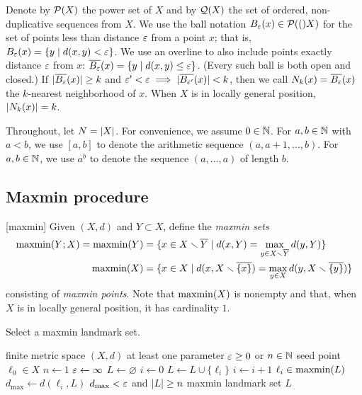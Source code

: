 \documentclass[
]{article}
\begin{document}
Denote by \(\mathcal{P}(X)\) the power set of \(X\) and by \(\mathcal{Q}(X)\) the
set of ordered, non-duplicative sequences from \(X\). We use the ball
notation \(B_{\varepsilon}(x) \in \mathcal{P}(()X)\) for the set of points less than
distance \(\varepsilon\) from a point \(x\); that is,
\(B_{\varepsilon}(x) = \{ y \mid d(x,y) < \varepsilon \}\). We use an overline to also
include points exactly distance \(\varepsilon\) from \(x\):
\(\overline{B_{\varepsilon}}(x) = \{ y \mid d(x,y) \leq \varepsilon \}\). (Every such ball
is both open and closed.) If \(\lvert \overline{B_\varepsilon}(x)\rvert \geq k\) and
\(\varepsilon'<\varepsilon \implies \lvert \overline{B_{\varepsilon'}}(x)\rvert < k\), then we call
\(N_k(x) = \overline{B_\varepsilon}(x)\) the \(k\)-nearest neighborhood of \(x\).
When \(X\) is in locally general position, \(\lvert N_k(x)\rvert = k\).

Throughout, let \(N=\lvert X\rvert\). For convenience, we assume \(0\in\mathbb{N}\).
For \(a,b \in \mathbb{N}\) with \(a<b\), we use \([a,b]\) to denote the
arithmetic sequence \((a,a+1,\ldots,b)\). For \(a,b \in \mathbb{N}\), we use
\(a^b\) to denote the sequence \((a,\ldots,a)\) of length \(b\).

\hypertarget{maxmin-procedure}{%
\subsection{Maxmin procedure}\label{maxmin-procedure}}

\label{sec:maxmin}

\begin{definition}\label{def:maxmin}[maxmin]
Given $(X,d)$ and $Y\subset X$, define the \emph{maxmin sets}
\begin{align*}
    \operatorname{maxmin}(Y;X) = \operatorname{maxmin}(Y) &= \{x\in X \smallsetminus \overline{Y}\mid d(x,Y) = \max_{y\in X\smallsetminus \overline{Y}}{d(y,Y)}\} \\
    \operatorname{maxmin}(X) &= \{x\in X\mid d(x,X \smallsetminus \overline{\{x\}}) = \max_{y\in X}{d(y,X \smallsetminus \overline{\{y\}})}\}
\end{align*}
consisting of \emph{maxmin points}.
Note that $\operatorname{maxmin}(X)$ is nonempty and that, when $X$ is in locally general position, it has cardinality $1$.
\end{definition}

\begin{algorithm}
\caption{Select a maxmin landmark set.}
\label{alg:maxmin}
\begin{algorithmic}[1]
\REQUIRE finite metric space $(X,d)$
\REQUIRE at least one parameter $\varepsilon\geq 0$ or $n\in\mathbb{N}$
\REQUIRE seed point $\ell_0 \in X$
    \STATE $n \leftarrow 1$
\ENDIF
{}
    \STATE $\varepsilon \leftarrow \infty$
\ENDIF
\STATE $L \leftarrow \varnothing$
\STATE $i \leftarrow 0$
\REPEAT
    \STATE $L \leftarrow L\cup\{\ell_i\}$
    \STATE $i \leftarrow i+1$
    \STATE $\ell_i \in \operatorname{maxmin}(L)$
    \STATE $d_{\operatorname{max}} \leftarrow d(\ell_i,L)$
\UNTIL $d_{\operatorname{max}} < \varepsilon$ and $\lvert L\rvert \geq n$
\RETURN maxmin landmark set $L$
\end{algorithmic}
\end{algorithm}
\end{document}
